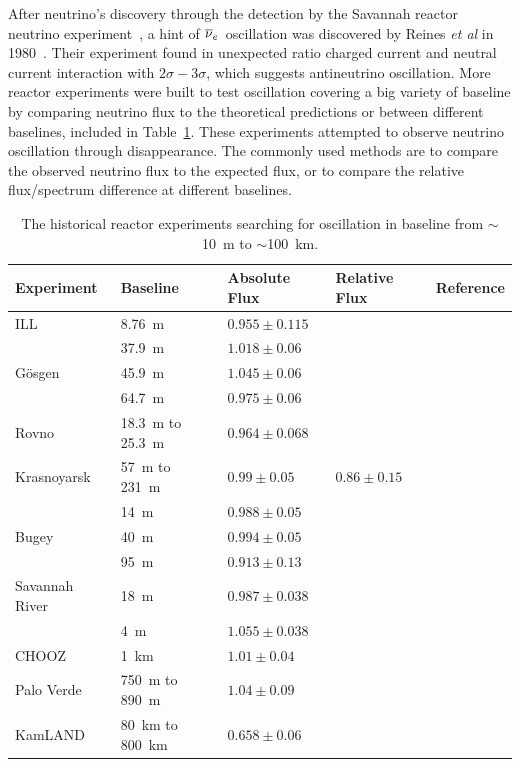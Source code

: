     After neutrino's discovery through the detection by the Savannah reactor neutrino experiment~\cite{bib:CowanReines},
    a hint of $\overline{\nu }_{e}\hspace{1pt}$ oscillation was discovered by Reines \textit{et al} in 1980~\cite{bib:reines1980}.
    Their experiment found in unexpected ratio charged current and neutral current interaction with $2\sigma-3\sigma$, which suggests antineutrino oscillation.
    More reactor experiments were built to test \nuebar oscillation covering a big variety of baseline by comparing neutrino flux to the theoretical predictions or between different baselines, included in Table~\ref{tab:history}.
    These experiments attempted to observe neutrino oscillation through \nuebar disappearance.
    The commonly used methods are to compare the observed neutrino flux to the expected flux, or to compare the relative flux/spectrum difference at different baselines.
    \begin{table}[h]
    \centering
    \caption[Historical reactor oscillation experiments]{The historical reactor experiments searching for \nuebar oscillation in baseline from $\sim$10~m to $\sim$100~km.}
    \begin{tabular}{lllll}
    \hline
    Experiment  & Baseline   & Absolute Flux  & Relative Flux    & Reference   \\ 
    \hline
    ILL     & 8.76~m  & $0.955\pm 0.115$  &  & \cite{bib:kwon1981}  \\
    \hline
        & 37.9~m   & $1.018\pm 0.06$  &   &   \\
    G\"osgen  & 45.9~m  & $1.045\pm 0.06$  &   & \cite{bib:gosgen}  \\
        & 64.7~m    & $0.975\pm 0.06$  &   &   \\
    \hline
    Rovno     & 18.3~m to 25.3~m     & $0.964\pm 0.068$  &   & \cite{bib:Afonin1987}  \\
    \hline
    Krasnoyarsk     &  57~m to 231~m    & $0.99\pm 0.05$  & $0.86\pm 0.15$  &  \cite{bib:Vidyakin1994} \\
    \hline
        & 14~m & $0.988\pm 0.05$  &   &   \\
    Bugey   & 40~m  & $0.994\pm 0.05$  &   &  \cite{bib:Bugey} \\
        & 95~m  & $0.913\pm 0.13$  &   &   \\
    \hline
    Savannah River  &  18~m & $0.987\pm 0.038$ &    & \cite{bib:Greenwood1996} \\
        &4~m    & $1.055\pm 0.038$  &   &   \\
    \hline
    CHOOZ   & 1~km     & $1.01\pm 0.04$   &   & \cite{bib:chooz98, bib:Chooz99, bib:chooz03}  \\
    \hline
    Palo Verde   &  750~m to 890~m & $1.04\pm 0.09$ &   &  \cite{bib:palo01, bib:palo1999, bib:palo2000} \\
    \hline
    KamLAND & 80~km to 800~km  &  $0.658\pm 0.06$ &   & \cite{bib:kamland02, bib:kamland04}  \\
    \hline
    \end{tabular}
    \label{tab:history}
    \end{table}
 
